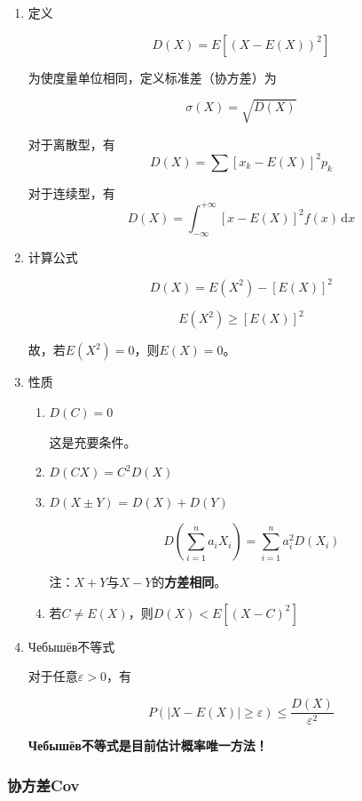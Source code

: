 \documentclass[UTF8,fontset=fandol,zihao=5]{ctexart}
\newcommand{\dd}{\,\mathrm{d}}
\begin{document}
\begin{enumerate}
  \item 定义
  
  \[
  D(X) = E\left[(X-E(X))^2\right]
  \]

  \begin{methodbox}
    为使度量单位相同，定义标准差（协方差）为
    
    \[
    \sigma(X) = \sqrt{D(X)}
    \]
  \end{methodbox}

  对于离散型，有
  \[
  D(X) = \sum \left[x_k - E(X)\right]^2 p_k
  \]

  对于连续型，有
  \[
  D(X) = \int_{-\infty}^{+\infty} [x - E(X)]^2 f(x)\dd x
  \]

  \item 计算公式
  
  \[
  D(X) = E(X^2) - [E(X)]^2
  \]

  \begin{methodbox}[引申公式]
    \[
    E(X^2) \geq [E(X)]^2
    \]

    故，若$E(X^2)=0$，则$E(X)=0$。
  \end{methodbox}

  \item 性质
  \begin{enumerate}[label=(\arabic*)]
    \item $D(C)=0$
  
    这是充要条件。

    \item $D(CX)=C^2 D(X)$
    
    \item $D(X \pm Y)$ = $D(X) + D(Y)$
    
    \[
    D\left(\sum_{i=1}^{n}a_i X_i\right)=\sum_{i=1}^{n}a_i^2 D(X_i)
    \]

    注：$X+Y$与$X-Y$的\textbf{方差相同}。
    \item 若$C \ne E(X)$，则$D(X) < E[(X - C)^2]$
  \end{enumerate}

  \item \russianserif Чебышёв不等式
  
  对于任意$\varepsilon>0$，有

  \[
  P(|X - E(X)| \geq \varepsilon) \leq \frac{D(X)}{\varepsilon^2}
  \]

  \textbf{{\russiansans Чебышёв}不等式是目前估计概率唯一方法！}
\end{enumerate}

\subsubsection{协方差Cov}
\end{document}
